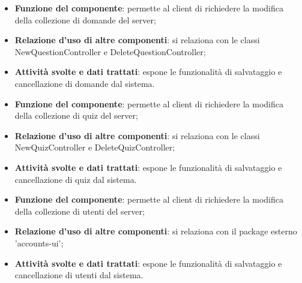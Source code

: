 \begin{itemize}
	\item\textbf{Funzione del componente}: permette al client di richiedere la modifica della collezione di domande del server;
	\item\textbf{Relazione d'uso di altre componenti}: si relaziona con le classi NewQuestionController e DeleteQuestionController;
	\item\textbf{Attività svolte e dati trattati}: espone le funzionalità di salvataggio e cancellazione di domande dal sistema.
\end{itemize}

\begin{itemize}
	\item\textbf{Funzione del componente}: permette al client di richiedere la modifica della collezione di quiz del server;
	\item\textbf{Relazione d'uso di altre componenti}: si relaziona con le classi NewQuizController e DeleteQuizController;
	\item\textbf{Attività svolte e dati trattati}: espone le funzionalità di salvataggio e cancellazione di quiz dal sistema.
\end{itemize}

\begin{itemize}
	\item\textbf{Funzione del componente}: permette al client di richiedere la modifica della collezione di utenti del server;
	\item\textbf{Relazione d'uso di altre componenti}:  si relaziona con il package esterno 'accounts-ui';
	\item\textbf{Attività svolte e dati trattati}: espone le funzionalità di salvataggio e cancellazione di utenti dal sistema.
\end{itemize}
\newpage

